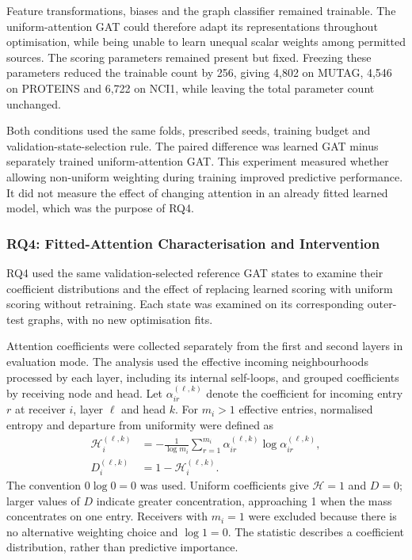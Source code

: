 \documentclass[11pt,a4paper]{article}
\begin{document}
Feature transformations, biases and the graph classifier remained trainable. The uniform-attention GAT could therefore adapt its representations throughout optimisation, while being unable to learn unequal scalar weights among permitted sources. The scoring parameters remained present but fixed. Freezing these parameters reduced the trainable count by 256, giving 4,802 on MUTAG, 4,546 on PROTEINS and 6,722 on NCI1, while leaving the total parameter count unchanged.

Both conditions used the same folds, prescribed seeds, training budget and validation-state-selection rule. The paired difference was learned GAT minus separately trained uniform-attention GAT. This experiment measured whether allowing non-uniform weighting during training improved predictive performance. It did not measure the effect of changing attention in an already fitted learned model, which was the purpose of RQ4.

\subsubsection{RQ4: Fitted-Attention Characterisation and Intervention}
\label{sec:rq4}

RQ4 used the same validation-selected reference GAT states to examine their coefficient distributions and the effect of replacing learned scoring with uniform scoring without retraining. Each state was examined on its corresponding outer-test graphs, with no new optimisation fits.

Attention coefficients were collected separately from the first and second layers in evaluation mode. The analysis used the effective incoming neighbourhoods processed by each layer, including its internal self-loops, and grouped coefficients by receiving node and head. Let \(\alpha_{ir}^{(\ell,k)}\) denote the coefficient for incoming entry \(r\) at receiver \(i\), layer \(\ell\) and head \(k\). For \(m_i>1\) effective entries, normalised entropy and departure from uniformity were defined as
\begin{equation}
\begin{aligned}
\mathcal{H}_i^{(\ell,k)}
&=-\frac{1}{\log m_i}
\sum_{r=1}^{m_i}
\alpha_{ir}^{(\ell,k)}\log\alpha_{ir}^{(\ell,k)},\\
D_i^{(\ell,k)}
&=1-\mathcal{H}_i^{(\ell,k)}.
\end{aligned}
\label{eq:attention-departure}
\end{equation}
The convention \(0\log0=0\) was used. Uniform coefficients give \(\mathcal{H}=1\) and \(D=0\); larger values of \(D\) indicate greater concentration, approaching 1 when the mass concentrates on one entry. Receivers with \(m_i=1\) were excluded because there is no alternative weighting choice and \(\log 1=0\). The statistic describes a coefficient distribution, rather than predictive importance.
\end{document}
